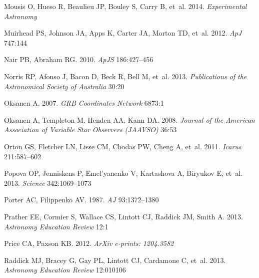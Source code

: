 \documentclass{ar2e}
\def\apj{ApJ}
\def\apjs{ApJS}
\def\aj{AJ}
\begin{document}
\begin{thebibliography}{}
{Mousis} O, {Hueso} R, {Beaulieu} JP, {Bouley} S, {Carry} B, et~al. 2014.
\newblock \textit{Experimental Astronomy}

{Muirhead} PS, {Johnson} JA, {Apps} K, {Carter} JA, {Morton} TD, et~al. 2012.
\newblock \textit{\apj} 747:144

{Nair} PB, {Abraham} RG. 2010.
\newblock \textit{\apjs} 186:427--456

{Norris} RP, {Afonso} J, {Bacon} D, {Beck} R, {Bell} M, et~al. 2013.
\newblock \textit{Publications of the Astronomical Society of Australia} 30:20

{Oksanen} A. 2007.
\newblock \textit{GRB Coordinates Network} 6873:1

{Oksanen} A, {Templeton} M, {Henden} AA, {Kann} DA. 2008.
\newblock \textit{Journal of the American Association of Variable Star
  Observers (JAAVSO)} 36:53

Orton GS, Fletcher LN, Lisse CM, Chodas PW, Cheng A, et~al. 2011.
\newblock \textit{Icarus} 211:587--602

{Popova} OP, {Jenniskens} P, {Emel'yanenko} V, {Kartashova} A, {Biryukov} E,
  et~al. 2013.
\newblock \textit{Science} 342:1069--1073

{Porter} AC, {Filippenko} AV. 1987.
\newblock \textit{\aj} 93:1372--1380

{Prather} EE, {Cormier} S, {Wallace} CS, {Lintott} CJ, {Raddick} JM, {Smith} A.
  2013.
\newblock \textit{{Astronomy Education Review}} 12:1

{Price} CA, {Paxson} KB. 2012.
\newblock \textit{ArXiv e-prints: 1204.3582}

{Raddick} MJ, {Bracey} G, {Gay} PL, {Lintott} CJ, {Cardamone} C, et~al. 2013.
\newblock \textit{Astronomy Education Review} 12:010106


\end{thebibliography}
\end{document}
